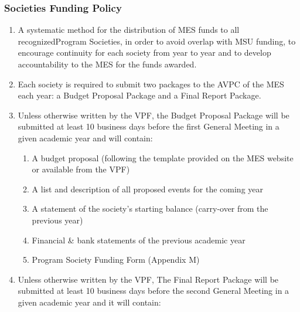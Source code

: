 \hypertarget{societies-funding-policy}{%
 \subsubsection{Societies Funding
  Policy}
 \label{societies-funding-policy}}
\begin{enumerate}
 \item
  A systematic method for the distribution of MES funds to all
  recognizedProgram Societies, in order to avoid overlap with MSU
  funding, to encourage continuity for each society from year to year
  and to develop accountability to the MES for the funds awarded. %
 \item
  Each society is required to submit two packages to the AVPC of the MES
  each year: a Budget Proposal Package and a Final Report Package.
 \item
  Unless otherwise written by the VPF, the Budget Proposal Package will
  be submitted at least 10 business days before the first General
  Meeting in a given academic year and will contain:

  \begin{enumerate}
   \item
    A budget proposal (following the template provided on the MES
    website or available from the VPF)
   \item
    A list and description of all proposed events for the coming year
   \item
    A statement of the society's starting balance (carry-over from the
    previous year)
   \item
    Financial \& bank statements of the previous academic year
   \item
    Program Society Funding Form (Appendix M) %
  \end{enumerate}
 \item
  Unless otherwise written by the VPF, The Final Report Package will be
  submitted at least 10 business days before the second General Meeting
  in a given academic year and it will contain:


\end{enumerate}
